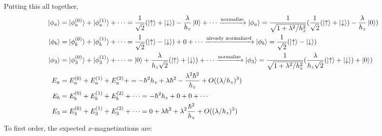 \documentclass[10pt]{article}
\newcommand{\1}{\mathbf 1}
\begin{document}
Putting this all together,
\begin{align}
	\ket{\phi_a}
	&=
	\ket{\phi_a^{(0)}}
	+
	\ket{\phi_a^{(1)}}
	+
	\cdots
	=
	\frac{1}{\sqrt{2}} (\ket{\uparrow} + \ket{\downarrow})
	-
	\frac{\lambda}{h_z} \ket{0}
	+
	\cdots
	\xrightarrow{\text{normalize}}
	\ket{\phi_a}
	=
	\frac{1}{\sqrt{1+\lambda^2/h_z^2}}
	(	\frac{1}{\sqrt{2}} (\ket{\uparrow} + \ket{\downarrow})
	-
	\frac{\lambda}{h_z} \ket{0})
	\\
	\ket{\phi_b}
	&=
	\ket{\phi_b^{(0)}}
	+
	\ket{\phi_b^{(1)}}
	+
	\cdots
	=
	\frac{1}{\sqrt{2}} (\ket{\uparrow} - \ket{\downarrow})
	+
	0
	+
	\cdots
	\xrightarrow{\text{already normalized}}
	\ket{\phi_b}
	=	\frac{1}{\sqrt{2}} (\ket{\uparrow} - \ket{\downarrow})
	\\
	\ket{\phi_3}
	&=
	\ket{\phi_3^{(0)}}
	+
	\ket{\phi_3^{(1)}}
	+
	\cdots
	=
	\ket{0}
	+
	\frac{\lambda}{h_z\sqrt{2}}
	(\ket{\uparrow}+\ket{\downarrow})
	+
	\cdots
	\xrightarrow{\text{normalize}}
	\ket{\phi_3}
	=
	\frac{1}{\sqrt{1+\lambda^2/h_z^2}}
	(
		\frac{\lambda}{h_z\sqrt{2}}
		(\ket{\uparrow}+\ket{\downarrow})
		+
		\ket{0}
	)
	\\
	E_a
	&=
	E_a^{(0)}
	+
	E_a^{(1)}
	+
	E_a^{(2)}
	+
	=
	-\hbar^2 h_z 
	+
	\lambda\hbar^2
	-
	 \frac{\lambda^2\hbar^2}{h_z}
	+
	O((\lambda/h_z)^3)
	\\
	E_b
	&=
	E_b^{(0)}
	+
	E_b^{(1)}
	+
	E_b^{(2)}
	+
	\cdots
	=
	-\hbar^2 h_z 
	+
	0
	+
	0
	+
	\cdots
	\\
	E_3
	&=
	E_3^{(0)}
	+
	E_3^{(1)}
	+
	E_3^{(2)}
	+
	\cdots
	=
	0
	+
	\lambda \hbar^2
	+
	\lambda^2\frac{\hbar^2}{h_z}
	+
	O((\lambda/h_z)^3)
\end{align}
To first order, the expected $x$-magnetizations are:
\end{document}
